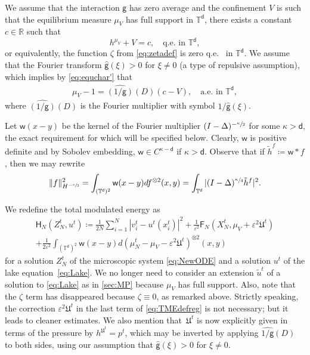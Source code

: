 \documentclass[JEP,XML,SOM,Unicode,published]{cedram}
\theoremstyle{plain}
\theoremstyle{definition}
\newcommand{\R}{{\mathbb{R}}}
\newcommand{\T}{{\mathbb{T}}}
\let\vep\varepsilon
\let\ka\kappa
\let\tl\tilde
\let\ux X
\newcommand{\ZN}{Z_N}
\newcommand{\Uu}{\mathfrak{U}}
\newcommand{\Fr}{\mathsf{F}}
\newcommand{\Hr}{\mathsf{H}}
\renewcommand{\d}{\mathsf{d}}
\newcommand{\g}{{\mathsf{g}}}
\newcommand{\w}{\mathsf{w}}
\begin{document}
We assume that the interaction $\g$ has zero average and the confinement $V$ is such that the equilibrium measure $\mu_V$ has full support in $\T^\d$, \ie there exists a constant $c\in\R$ such that%
\begin{equation}\label{eq:equchar'}
h^{\mu_V} + V = c, \quad \text{q.e.} \text{ in } \T^\d,
\end{equation}
or equivalently, the function $\zeta$ from \eqref{eq:zetadef} is zero q.e.%
~in $\T^\d$. We assume that the Fourier transform $\hat{\g}(\xi)>0$ for $\xi\ne 0$ (a type of repulsive assumption), which implies by \eqref{eq:equchar'} that
\begin{align*}
\mu_V -1 = {\widehat{(1/\g)}(D)}(c-V), \quad \text{a.e.} \text{ in } \T^\d,
\end{align*}
where {$\widehat{(1/\g)}(D)$} is the Fourier multiplier with symbol {$1/\hat{\g}(\xi)$}.

Let $\w(x-y)$ be the kernel of the Fourier multiplier $(I-\Delta)^ {-\sfrac{\ka}{2}}$ for some {$\ka > \d$}, {the exact requirement for which will be specified below}. Clearly, $\w$ is positive definite and by Sobolev embedding, $\w\in C^{{\ka-\d}}$ if {$\ka>\d$}. Observe that if $\tl{h}^f \coloneqq \w\ast f$, then we may rewrite
\begin{equation}\label{eq:welec}
\|f\|_{H^{-\sfrac{\ka}{2}}}^2 = \int_{(\T^\d)^2}\w(x-y)df^{\otimes 2}(x,y) = \int_{\T^\d} |(I-\Delta)^{\sfrac{\ka}{4}}\tl{h}^{f}|^2.
\end{equation}

We {redefine} the total modulated energy as
\begin{multline}\label{eq:TMEdefreg}
\Hr_N(\ZN^t,u^t) \coloneqq \frac{1}{2N}\sum_{i=1}^N |v_i^t-u^t(x_i^t)|^2 + \frac{1}{\vep^2}\Fr_N(\ux_N^t,\mu_V+\vep^2\Uu^t) \\
+\frac{1}{2\vep^2}\int_{(\T^\d)^2}\w(x-y)d(\mu_N^t-\mu_V-\vep^2\Uu^t)^{\otimes 2}(x,y)
\end{multline}
for a solution $\ZN^t$ of the microscopic system \eqref{eq:NewODE} and a solution $u^t$ of the lake equation~\eqref{eq:Lake}. We no longer need to consider an extension $\tl{u}^t$ of a solution to \eqref{eq:Lake} as in \cref{sec:MP} because $\mu_V$ has full support. Also, note that the $\zeta$ term has disappeared because $\zeta\equiv 0$, as remarked above. Strictly speaking, the correction $\vep^2\Uu^t$ in the last term of \eqref{eq:TMEdefreg} is not necessary; but it leads to cleaner estimates. We also mention that~$\Uu^t$ is now explicitly given in terms of the pressure by $h^{\Uu^t} = p^t$, which may be inverted by applying {$\widehat{1/\g}(D)$} to both sides, using our assumption that $\hat{\g}(\xi)>0$ for $\xi\ne 0$.
\end{document}
